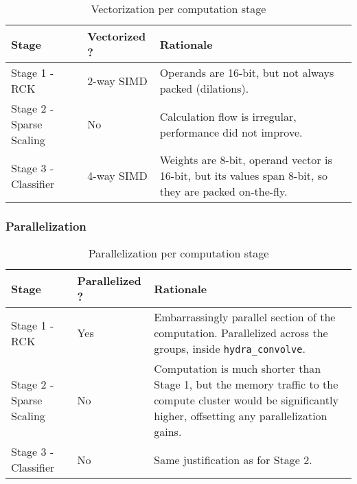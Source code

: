        \begin{table}[H]
        \begin{tabular}{||p{1.5in}|p{1.5in}|p{2.5in}||}
            \hline
            Stage & Vectorized ? & Rationale  \\

            \hline\hline
            Stage 1 - RCK            & 2-way SIMD & Operands are 16-bit, but not always packed (dilations).\\
            \hline
            Stage 2 - Sparse Scaling & No         & Calculation flow is irregular, performance did not improve.\\
            \hline
            Stage 3 - Classifier     & 4-way SIMD & Weights are 8-bit, operand vector is 16-bit, but its values span 8-bit, so they are packed on-the-fly.\\
            \hline
        \end{tabular}
        \caption{Vectorization per computation stage}
        \label{tbl:vect_summary}
        \end{table}

        \subsubsection{Parallelization}\label{sec:im_nanohydra_embimp_paral}

        \begin{table}[H]
        \begin{tabular}{||p{1.5in}|p{1.5in}|p{2.5in}||}
            \hline
            Stage & Parallelized ? & Rationale  \\

            \hline\hline
            Stage 1 - RCK            & Yes & Embarrassingly parallel section of the computation. Parallelized across the groups, inside \verb|hydra_convolve|.\\
            \hline
            Stage 2 - Sparse Scaling & No  & Computation is much shorter than Stage 1, but the memory traffic to the compute cluster would be significantly higher, offsetting any parallelization gains.\\
            \hline
            Stage 3 - Classifier     & No  & Same justification as for Stage 2.\\
            \hline
        \end{tabular}
        \caption{Parallelization per computation stage}
        \label{tbl:vect_summary}
        \end{table}

